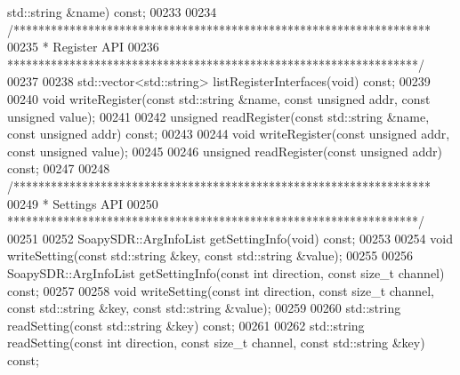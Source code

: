 \begin{DoxyCode}
      std::string &name) \textcolor{keyword}{const};
00233 
00234     \textcolor{comment}{/*******************************************************************}
00235 \textcolor{comment}{     * Register API}
00236 \textcolor{comment}{     ******************************************************************/}
00237 
00238     std::vector<std::string> listRegisterInterfaces(\textcolor{keywordtype}{void}) \textcolor{keyword}{const};
00239 
00240     \textcolor{keywordtype}{void} writeRegister(\textcolor{keyword}{const} std::string &name, \textcolor{keyword}{const} \textcolor{keywordtype}{unsigned} addr, \textcolor{keyword}{const} \textcolor{keywordtype}{unsigned} value);
00241 
00242     \textcolor{keywordtype}{unsigned} readRegister(\textcolor{keyword}{const} std::string &name, \textcolor{keyword}{const} \textcolor{keywordtype}{unsigned} addr) \textcolor{keyword}{const};
00243 
00244     \textcolor{keywordtype}{void} writeRegister(\textcolor{keyword}{const} \textcolor{keywordtype}{unsigned} addr, \textcolor{keyword}{const} \textcolor{keywordtype}{unsigned} value);
00245 
00246     \textcolor{keywordtype}{unsigned} readRegister(\textcolor{keyword}{const} \textcolor{keywordtype}{unsigned} addr) \textcolor{keyword}{const};
00247 
00248     \textcolor{comment}{/*******************************************************************}
00249 \textcolor{comment}{     * Settings API}
00250 \textcolor{comment}{     ******************************************************************/}
00251 
00252     SoapySDR::ArgInfoList getSettingInfo(\textcolor{keywordtype}{void}) \textcolor{keyword}{const};
00253 
00254     \textcolor{keywordtype}{void} writeSetting(\textcolor{keyword}{const} std::string &key, \textcolor{keyword}{const} std::string &value);
00255 
00256     SoapySDR::ArgInfoList getSettingInfo(\textcolor{keyword}{const} \textcolor{keywordtype}{int} direction, \textcolor{keyword}{const} \textcolor{keywordtype}{size\_t} channel) \textcolor{keyword}{const};
00257 
00258     \textcolor{keywordtype}{void} writeSetting(\textcolor{keyword}{const} \textcolor{keywordtype}{int} direction, \textcolor{keyword}{const} \textcolor{keywordtype}{size\_t} channel, \textcolor{keyword}{const} 
      std::string &key, \textcolor{keyword}{const} std::string &value);
00259 
00260     std::string readSetting(\textcolor{keyword}{const} std::string &key) \textcolor{keyword}{const};
00261 
00262     std::string readSetting(\textcolor{keyword}{const} \textcolor{keywordtype}{int} direction, \textcolor{keyword}{const} \textcolor{keywordtype}{size\_t} channel, \textcolor{keyword}{const} 
      std::string &key) \textcolor{keyword}{const};

\end{DoxyCode}
